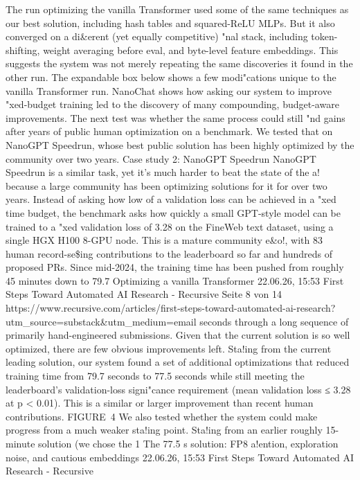 The run optimizing the vanilla Transformer used some of the same techniques
as our best solution, including hash tables and squared-ReLU MLPs. But it also
converged on a di\&erent (yet equally competitive) "nal stack, including token-
shifting, weight averaging before eval, and byte-level feature embeddings.
This suggests the system was not merely repeating the same discoveries it
found in the other run. The expandable box below shows a few modi"cations
unique to the vanilla Transformer run.
NanoChat shows how asking our system to improve "xed-budget training led to
the discovery of many compounding, budget-aware improvements. The next test
was whether the same process could still "nd gains after years of public human
optimization on a benchmark. We tested that on NanoGPT Speedrun, whose
best public solution has been highly optimized by the community over two years.
Case study 2: NanoGPT Speedrun
NanoGPT Speedrun is a similar task, yet it's much harder to beat the state
of the a! because a large community has been optimizing solutions for
it for over two years. Instead of asking how low of a validation loss can
be achieved in a "xed time budget, the benchmark asks how quickly a
small GPT-style model can be trained to a "xed validation loss of 3.28 on
the FineWeb text dataset, using a single HGX H100 8-GPU node.
This is a mature community e\&o!, with 83 human record-se\$ing contributions
to the leaderboard so far and hundreds of proposed PRs. Since mid-2024,
the training time has been pushed from roughly 45 minutes down to 79.7
Optimizing a vanilla Transformer
22.06.26, 15:53
First Steps Toward Automated AI Research - Recursive
Seite 8 von 14
https://www.recursive.com/articles/first-steps-toward-automated-ai-research?utm\_source=substack\&utm\_medium=email
seconds through a long sequence of primarily hand-engineered submissions.
Given that the current solution is so well optimized, there are few obvious
improvements left.
Sta!ing from the current leading solution, our system found a set of additional
optimizations that reduced training time from 79.7 seconds to 77.5 seconds
while still meeting the leaderboard’s validation-loss signi"cance requirement
(mean validation loss ≤ 3.28 at p < 0.01).  This is a similar or larger improvement
than recent human contributions.
FIGURE 4
We also tested whether the system could make progress from a much weaker
sta!ing point. Sta!ing from an earlier roughly 15-minute solution (we chose the
1
The 77.5 s solution: FP8 a!ention,
exploration noise, and cautious embeddings
22.06.26, 15:53
First Steps Toward Automated AI Research - Recursive
